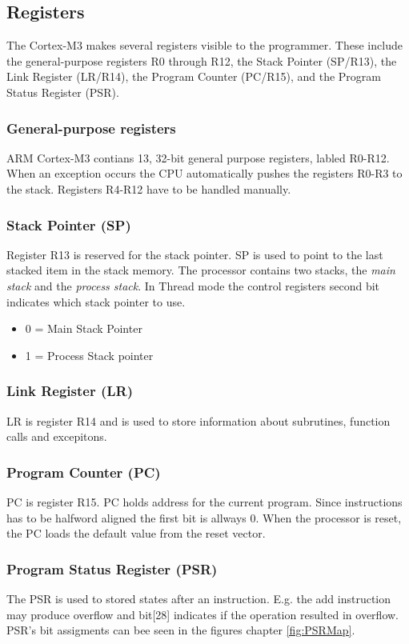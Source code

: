 \subsection{Registers}
The Cortex-M3 makes several registers visible to the programmer. These include the general-purpose registers R0 through R12, the Stack Pointer (SP/R13), the Link Register (LR/R14), the Program Counter (PC/R15), and the Program Status Register (PSR). 

\subsubsection{General-purpose registers}
ARM Cortex-M3 contians 13, 32-bit general purpose registers, labled R0-R12. When an exception occurs the CPU automatically pushes the registers R0-R3 to the stack. Registers R4-R12 have to be handled manually.

\subsubsection{Stack Pointer (SP)}
Register R13 is reserved for the stack pointer. SP is used to point to the last stacked item in the stack memory. The processor contains two stacks, the \emph{main stack} and the \emph{process stack}. In Thread mode the control registers second bit indicates which stack pointer to use.

\begin{itemize}
\item 0 = Main Stack Pointer
\item 1 = Process Stack pointer
\end{itemize}

\subsubsection{Link Register (LR)}
LR is register R14 and is used to store information about subrutines, function calls and excepitons.

\subsubsection{Program Counter (PC)}
PC is register R15. PC holds address for the current program. Since instructions has to be halfword aligned the first bit is allways 0. When the processor is reset, the PC loads the default value from the reset vector. 

\subsubsection{Program Status Register (PSR)}
The PSR is used to stored states after an instruction. E.g. the add instruction may produce overflow and bit[28] indicates if the operation resulted in overflow. PSR's bit assigments can bee seen in the figures chapter \ref{fig:PSRMap}.

